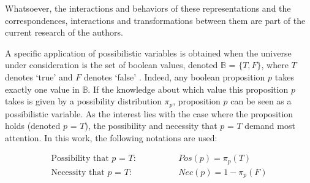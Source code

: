 Whatsoever, the interactions and behaviors of these representations and the correspondences, interactions and transformations between them are part of the current research of the authors.



A specific application of possibilistic variables is obtained when the universe under consideration is the set of boolean values, denoted $\mathbb{B}$ = $\{T,F\}$, where $T$ denotes `true' and $F$ denotes `false' \cite{Pon11}. Indeed, any boolean proposition $p$ takes exactly one value in $\mathbb{B}$. If the knowledge about which value this proposition $p$ takes is given by a possibility distribution $\pi_p$, proposition $p$ can be seen as a possibilistic variable. As the interest lies with the case where the proposition holds (denoted $p$ = $T$), the possibility and necessity that $p$ = $T$ demand most attention. In this work, the following notations are used:

\vspace{-15pt}
\begin{align}
\text{Possibility that $p$ = $T$:} \hspace{50pt} & Pos(p) = \pi_p(T) \label{propholdsposs} \\
\text{Necessity that $p$ = $T$:} \hspace{50pt} & Nec(p) = 1-\pi_p(F) \label{propholdsnecc}
\end{align}


